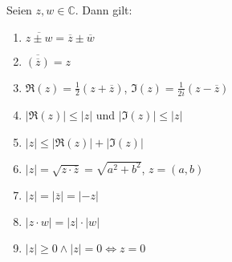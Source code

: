 Seien $z, w \in \mathbb{C}$. Dann gilt: 
\begin{enumerate}
    \item $\overline{z \pm w} = \overline{z} \pm \overline{w}$
    \item $\overline{(\overline{z})} = z$
    \item $\Re(z) = \frac{1}{2}(z+\overline{z})$,
    $\Im(z) = \frac{1}{2i}(z-\overline{z})$
    \item $|\Re(z)| \leq |z|$ und
    $|\Im(z)| \leq |z|$
    \item $|z| \leq |\Re(z)| + |\Im(z)|$
    \item $|z| = \sqrt{z \cdot \overline{z}} = \sqrt{a^2+b^2}$,
    $z = (a, b)$
    \item $|z| = |\overline{z}| = |-z|$
    \item $|z \cdot w| = |z| \cdot |w|$
    \item $|z| \geq 0 \land |z| = 0 \Leftrightarrow z = 0$
\end{enumerate}